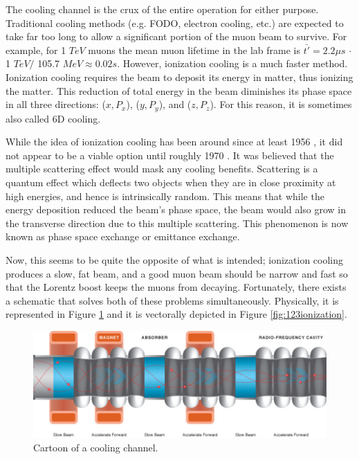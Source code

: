 The cooling channel is the crux of the entire operation for either purpose. Traditional cooling methods (e.g. FODO, electron cooling, etc.) are expected to take far too long to allow a significant portion of the muon beam to survive. For example, for 1 $TeV$ muons the mean muon lifetime in the lab frame is $\bar{t'}=2.2 \mu s$ $\cdot$ 1 $TeV/$ 105.7 $MeV \approx 0.02s$.
 However, ionization cooling is a much faster method. Ionization cooling requires the beam to deposit its energy in matter, thus ionizing the matter. This reduction of total energy in the beam diminishes its phase space in all three directions: ($x, P_x$), ($y, P_y$), and ($z, P_z$). For this reason, it is sometimes also called 6D cooling. 

While the idea of ionization cooling has been around since at least 1956 \cite{oneill,lichtenberg}, it did not appear to be a viable option until roughly 1970 \cite{YuM}. It was believed that the multiple scattering effect would mask any cooling benefits. Scattering is a quantum effect which deflects two objects when they are in close proximity at high energies, and hence is intrinsically random. This means that while the energy deposition reduced the beam's phase space, the beam would also grow in the transverse direction due to this multiple scattering. This phenomenon is now known as phase space exchange or emittance exchange.

Now, this seems to be quite the opposite of what is intended; ionization cooling produces a slow, fat beam, and a good muon beam should be narrow and fast so that the Lorentz boost keeps the muons from decaying. Fortunately, there exists a schematic that solves both of these problems simultaneously. Physically, it is represented in  Figure \ref{fig:coolingchannel} and it is vectorally depicted in Figure \ref{fig:123ionization}.
\begin{figure}
  \begin{center} 
    \includegraphics[width=\textwidth]{Figures/coolingchannel} 
  \caption{Cartoon of a cooling channel.}
  \label{fig:coolingchannel}
 \end{center}
\end{figure}

